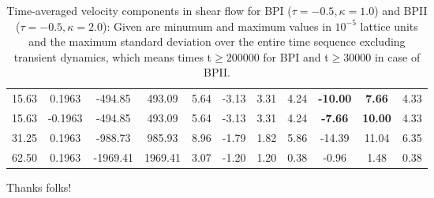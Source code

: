 \documentclass[aps,pre,reprint,superscriptaddress, twocolumn]{revtex4}
\begin{document}
\begin{table}
\begin{tabular}{|c|| c || c |c |c||c| c| c||c| c| c|}
15.63 &0.1963 &-494.85 &493.09 & 5.64 &-3.13 &3.31 &4.24 &\bf{-10.00} & \bf{7.66} &4.33\\
15.63 &-0.1963&-494.85 &493.09 & 5.64 & -3.13 &3.31 &4.24 &\bf{-7.66} & \bf{10.00} &4.33\\
31.25 &0.1963 &-988.73 &985.93 &8.96  &-1.79 &1.82 &5.86 &-14.39 & 11.04 &6.35\\
62.50 &0.1963 & -1969.41  & 1969.41 & 3.07 & -1.20 & 1.20 & 0.38 &-0.96 & 1.48 &0.38 \\
\hline
\end{tabular}
\caption{Time-averaged velocity components in shear flow for BPI ($\tau=-0.5, \kappa=1.0$) and BPII ($\tau=-0.5, \kappa=2.0$): Given are minumum and maximum values in $10^{-5}$ lattice units and the maximum standard deviation over the entire time sequence excluding transient dynamics, which means times t$\ge 200000$ for BPI and t$\ge 30000$ in case of BPII.
\label{tab1}}
\end{table}

\begin{acknowledgments}
Thanks folks!
\end{acknowledgments}


\end{document}
